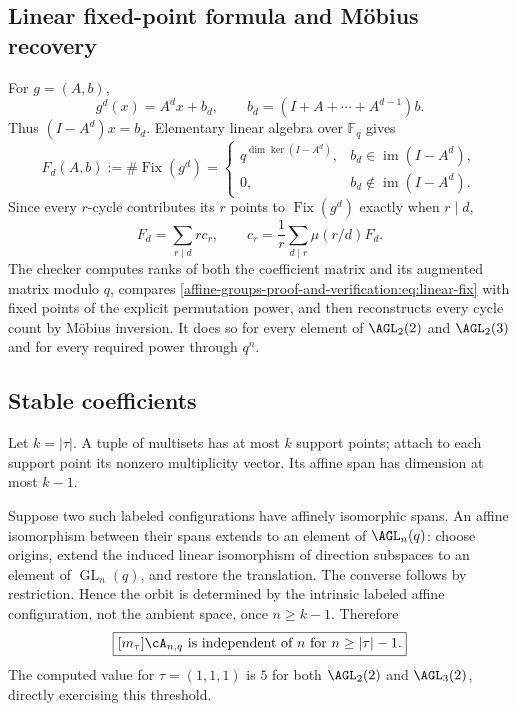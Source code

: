 \documentclass[10pt]{article}
\newcommand{\Fix}{\operatorname{Fix}}
\newcommand{\F}{\mathbb F}
\newcommand{\GL}{\operatorname{GL}}
\newcommand{\im}{\operatorname{im}}
\begin{document}
\subsection{Linear fixed-point formula and Möbius recovery}
For $g=(A,b)$,
\[
 g^d(x)=A^dx+b_d,\qquad b_d=(I+A+\cdots+A^{d-1})b.
\]
Thus $(I-A^d)x=b_d$.  Elementary linear algebra over $\F_q$ gives
\begin{equation}\label{affine-groups-proof-and-verification:eq:linear-fix}
 F_d(A,b):=\#\Fix(g^d)=
 \begin{cases}
 q^{\dim\ker(I-A^d)},&b_d\in\im(I-A^d),\\
 0,&b_d\notin\im(I-A^d).
 \end{cases}
\end{equation}
Since every $r$-cycle contributes its $r$ points to $\Fix(g^d)$ exactly when
$r\mid d$,
\[
 F_d=\sum_{r\mid d}r c_r,
 \qquad
 \boxed{c_r=\frac1r\sum_{d\mid r}\mu(r/d)F_d.}
\]
The checker computes ranks of both the coefficient matrix and its augmented
matrix modulo $q$, compares \eqref{affine-groups-proof-and-verification:eq:linear-fix} with fixed points of the
explicit permutation power, and then reconstructs every cycle count by
Möbius inversion.  It does so for every element of $\AGL_2(2)$ and
$\AGL_2(3)$ and for every required power through $q^n$.

\subsection{Stable coefficients}
Let $k=|\tau|$.  A tuple of multisets has at most $k$ support points; attach
to each support point its nonzero multiplicity vector.  Its affine span has
dimension at most $k-1$.

Suppose two such labeled configurations have affinely isomorphic spans.  An
affine isomorphism between their spans extends to an element of
$\AGL_n(q)$: choose origins, extend the induced linear isomorphism of
direction subspaces to an element of $\GL_n(q)$, and restore the translation.
The converse follows by restriction.  Hence the orbit is determined by the
intrinsic labeled affine configuration, not the ambient space, once
$n\ge k-1$.  Therefore
\[
 \boxed{[m_\tau]\cA_{n,q}\text{ is independent of }n
 \text{ for }n\ge |\tau|-1.}
\]
The computed value for $\tau=(1,1,1)$ is $5$ for both $\AGL_2(2)$ and
$\AGL_3(2)$, directly exercising this threshold.
\end{document}
